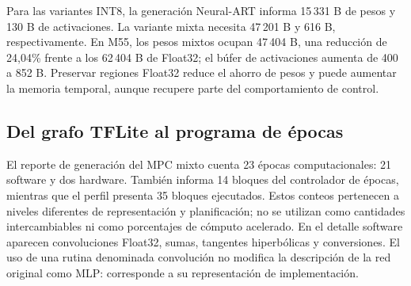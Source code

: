 Para las variantes INT8, la generación Neural-ART informa 15\,331 B de pesos y 130 B de activaciones. La variante mixta necesita 47\,201 B y 616 B, respectivamente. En M55, los pesos mixtos ocupan 47\,404 B, una reducción de 24,04\% frente a los 62\,404 B de Float32; el búfer de activaciones aumenta de 400 a 852 B. Preservar regiones Float32 reduce el ahorro de pesos y puede aumentar la memoria temporal, aunque recupere parte del comportamiento de control.

\FloatBarrier
\subsection{Del grafo TFLite al programa de épocas}

El reporte de generación del MPC mixto cuenta 23 épocas computacionales: 21 software y dos hardware. También informa 14 bloques del controlador de épocas, mientras que el perfil presenta 35 bloques ejecutados. Estos conteos pertenecen a niveles diferentes de representación y planificación; no se utilizan como cantidades intercambiables ni como porcentajes de cómputo acelerado. En el detalle software aparecen convoluciones Float32, sumas, tangentes hiperbólicas y conversiones. El uso de una rutina denominada convolución no modifica la descripción de la red original como MLP: corresponde a su representación de implementación.


